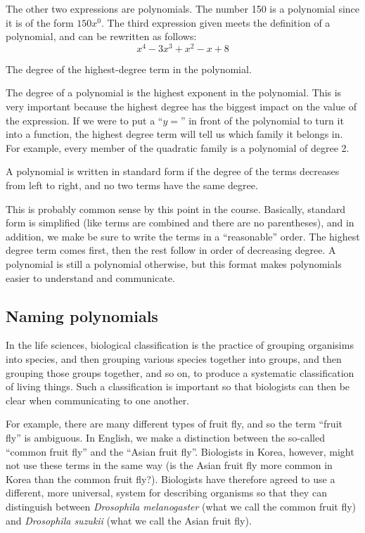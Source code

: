 The other two expressions are polynomials. The number 150 is a polynomial since it is of the form $150x^0$. The third expression given meets the definition of a polynomial, and can be rewritten as follows:
\[x^4 - 3x^3 + x^2 - x + 8\]

\begin{boxeddef}
The degree of the highest-degree term in the polynomial.
\end{boxeddef}

The degree of a polynomial is the highest exponent in the polynomial. This is very important because the highest degree has the biggest impact on the value of the expression. If we were to put a ``$y=$'' in front of the polynomial to turn it into a function, the highest degree term will tell us which family it belongs in. For example, every member of the quadratic family is a polynomial of degree 2.

\begin{boxeddef}
A polynomial is written in standard form if the degree of the terms decreases from left to right, and no two terms have the same degree.
\end{boxeddef} 

This is probably common sense by this point in the course. Basically, standard form is simplified (like terms are combined and there are no parentheses), and in addition, we make be sure to write the terms in a ``reasonable'' order. The highest degree term comes first, then the rest follow in order of decreasing degree. A polynomial is still a polynomial otherwise, but this format makes polynomials easier to understand and communicate.


\subsection{Naming polynomials}

In the life sciences, biological classification is the practice of grouping organisims into species, and then grouping various species together into groups, and then grouping those groups together, and so on, to produce a systematic classification of living things. Such a classification is important so that biologists can then be clear when communicating to one another.

For example, there are many different types of fruit fly, and so the term ``fruit fly'' is ambiguous. In English, we make a distinction between the so-called ``common fruit fly'' and the ``Asian fruit fly''. Biologists in Korea, however, might not use these terms in the same way (is the Asian fruit fly more common in Korea than the common fruit fly?). Biologists have therefore agreed to use a different, more universal, system for describing organisms so that they can distinguish between \textit{Drosophila melanogaster} (what we call the common fruit fly) and \textit{Drosophila suzukii} (what we call the Asian fruit fly).

